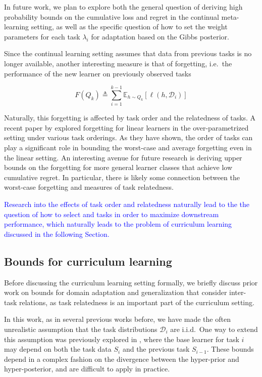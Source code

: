 \documentclass{article}
\theoremstyle{definition}
\newcommand{\Expect}[2]{\mathbb{E}_{#1}\left [#2 \right ]}
\newcommand{\LFe}[1]{\textcolor{blue}{#1}}
\begin{document}
In future work, we plan to explore both the general question of deriving high probability bounds on the cumulative loss and regret in the continual meta-learning setting, as well as the specific question of how to set the weight parameters for each task $\lambda_i$ for adaptation based on the Gibbs posterior. 

Since the continual learning setting assumes that data from previous tasks is no longer available, another interesting measure is that of forgetting, i.e.\ the performance of the new learner on previously observed tasks

$$F(Q_k)\triangleq \sum_{i=1}^{k-1}\Expect{h\sim Q_k}{\ell(h, \mathcal{D}_i)}$$

Naturally, this forgetting is affected by task order and the relatedness of tasks.
A recent paper by \citet{Evron2022} explored forgetting for linear learners in the over-parametrized setting under various task orderings. 
As they have shown, the order of tasks can play a significant role in bounding the worst-case and average forgetting even in the linear setting.
An interesting avenue for future research is deriving upper bounds on the forgetting for more general learner classes that achieve low cumulative regret. In particular, there is likely some connection between the worst-case forgetting and measures of task relatedness.

\LFe{Research into the effects of task order and relatedness naturally lead to the the question of how to select and tasks in order to maximize downstream performance, which naturally leads to the problem of curriculum learning discussed in the following Section.}

\subsection{Bounds for curriculum learning} 

Before discussing the curriculum learning setting formally, we briefly discuss prior work on bounds for domain adaptation and generalization that consider inter-task relations, as task relatedness is an important part of the curriculum setting.

In this work, as in several previous works \citep{Amit2018, Rothfuss2020, Farid2021} before, we have made the often unrealistic assumption that the task distributions $\mathcal{D}_i$ are i.i.d.\
One way to extend this assumption was previously explored in \citet{Pentina2015a}, where the base learner for task $i$ may depend on both the task data $S_i$ and the previous task $S_{i-1}$. These bounds depend in a complex fashion on the divergence between the hyper-prior and hyper-posterior, and are difficult to apply in practice.
\end{document}
